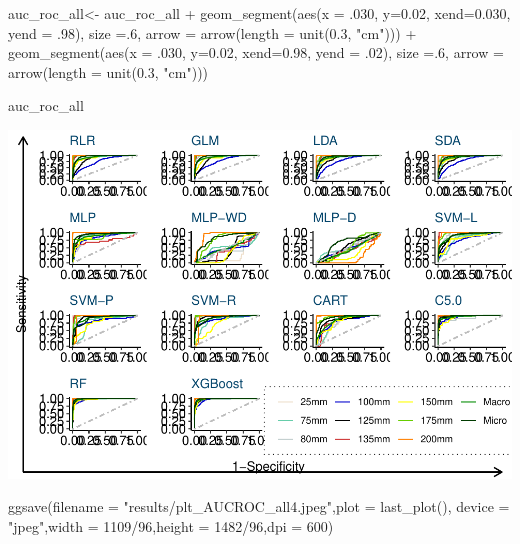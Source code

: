 \documentclass[
]{article}
\newenvironment{Shaded}{\begin{snugshade}}{\end{snugshade}}
\newcommand{\AttributeTok}[1]{\textcolor[rgb]{0.77,0.63,0.00}{#1}}
\newcommand{\DecValTok}[1]{\textcolor[rgb]{0.00,0.00,0.81}{#1}}
\newcommand{\FloatTok}[1]{\textcolor[rgb]{0.00,0.00,0.81}{#1}}
\newcommand{\FunctionTok}[1]{\textcolor[rgb]{0.00,0.00,0.00}{#1}}
\newcommand{\NormalTok}[1]{#1}
\newcommand{\OtherTok}[1]{\textcolor[rgb]{0.56,0.35,0.01}{#1}}
\newcommand{\SpecialCharTok}[1]{\textcolor[rgb]{0.00,0.00,0.00}{#1}}
\newcommand{\StringTok}[1]{\textcolor[rgb]{0.31,0.60,0.02}{#1}}
\begin{document}
\begin{Shaded}
\begin{Highlighting}[]
\NormalTok{auc\_roc\_all}\OtherTok{\textless{}{-}}\NormalTok{ auc\_roc\_all }\SpecialCharTok{+}
  \FunctionTok{geom\_segment}\NormalTok{(}\FunctionTok{aes}\NormalTok{(}\AttributeTok{x =}\NormalTok{ .}\DecValTok{030}\NormalTok{, }\AttributeTok{y=}\FloatTok{0.02}\NormalTok{, }\AttributeTok{xend=}\FloatTok{0.030}\NormalTok{, }\AttributeTok{yend =}\NormalTok{ .}\DecValTok{98}\NormalTok{), }\AttributeTok{size =}\NormalTok{.}\DecValTok{6}\NormalTok{,}
               \AttributeTok{arrow =} \FunctionTok{arrow}\NormalTok{(}\AttributeTok{length =} \FunctionTok{unit}\NormalTok{(}\FloatTok{0.3}\NormalTok{, }\StringTok{"cm"}\NormalTok{))) }\SpecialCharTok{+}
  \FunctionTok{geom\_segment}\NormalTok{(}\FunctionTok{aes}\NormalTok{(}\AttributeTok{x =}\NormalTok{ .}\DecValTok{030}\NormalTok{, }\AttributeTok{y=}\FloatTok{0.02}\NormalTok{, }\AttributeTok{xend=}\FloatTok{0.98}\NormalTok{, }\AttributeTok{yend =}\NormalTok{ .}\DecValTok{02}\NormalTok{), }\AttributeTok{size =}\NormalTok{.}\DecValTok{6}\NormalTok{,}
               \AttributeTok{arrow =} \FunctionTok{arrow}\NormalTok{(}\AttributeTok{length =} \FunctionTok{unit}\NormalTok{(}\FloatTok{0.3}\NormalTok{, }\StringTok{"cm"}\NormalTok{)))}

\NormalTok{auc\_roc\_all}
\end{Highlighting}
\end{Shaded}

\includegraphics{sl-inf-cairs-2301_files/figure-latex/AUCplots-1.pdf}

\begin{Shaded}
\begin{Highlighting}[]
\FunctionTok{ggsave}\NormalTok{(}\AttributeTok{filename =} \StringTok{"results/plt\_AUCROC\_all4.jpeg"}\NormalTok{,}\AttributeTok{plot =} \FunctionTok{last\_plot}\NormalTok{(),}
\AttributeTok{device =} \StringTok{"jpeg"}\NormalTok{,}\AttributeTok{width =} \DecValTok{1109}\SpecialCharTok{/}\DecValTok{96}\NormalTok{,}\AttributeTok{height =} \DecValTok{1482}\SpecialCharTok{/}\DecValTok{96}\NormalTok{,}\AttributeTok{dpi =} \DecValTok{600}\NormalTok{)}
\end{Highlighting}
\end{Shaded}
\end{document}
